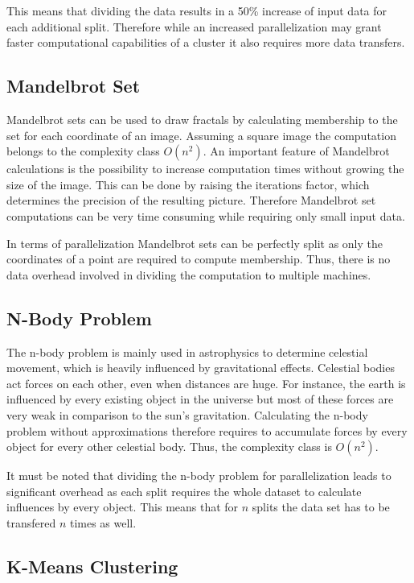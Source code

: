 This means that dividing the data results in a 50\% increase of input data for each additional split. Therefore while an increased parallelization may grant faster computational capabilities of a cluster it also requires more data transfers.

\subsection*{Mandelbrot Set}

Mandelbrot sets can be used to draw fractals by calculating membership to the set for each coordinate of an image. Assuming a square image the computation belongs to the complexity class $O(n^2)$. An important feature of Mandelbrot calculations is the possibility to increase computation times without growing the size of the image. This can be done by raising the iterations factor, which determines the precision of the resulting picture. Therefore Mandelbrot set computations can be very time consuming while requiring only small input data.

In terms of parallelization Mandelbrot sets can be perfectly split as only the coordinates of a point are required to compute membership. Thus, there is no data overhead involved in dividing the computation to multiple machines.

\subsection*{N-Body Problem}

The n-body problem is mainly used in astrophysics to determine celestial movement, which is heavily influenced by gravitational effects. Celestial bodies act forces on each other, even when distances are huge. For instance, the earth is influenced by every existing object in the universe but most of these forces are very weak in comparison to the sun's gravitation. Calculating the n-body problem without approximations therefore requires to accumulate forces by every object for every other celestial body. Thus, the complexity class is $O(n^2)$.

It must be noted that dividing the n-body problem for parallelization leads to significant overhead as each split requires the whole dataset to calculate influences by every object. This means that for $n$ splits the data set has to be transfered $n$ times as well.

\subsection*{K-Means Clustering}

